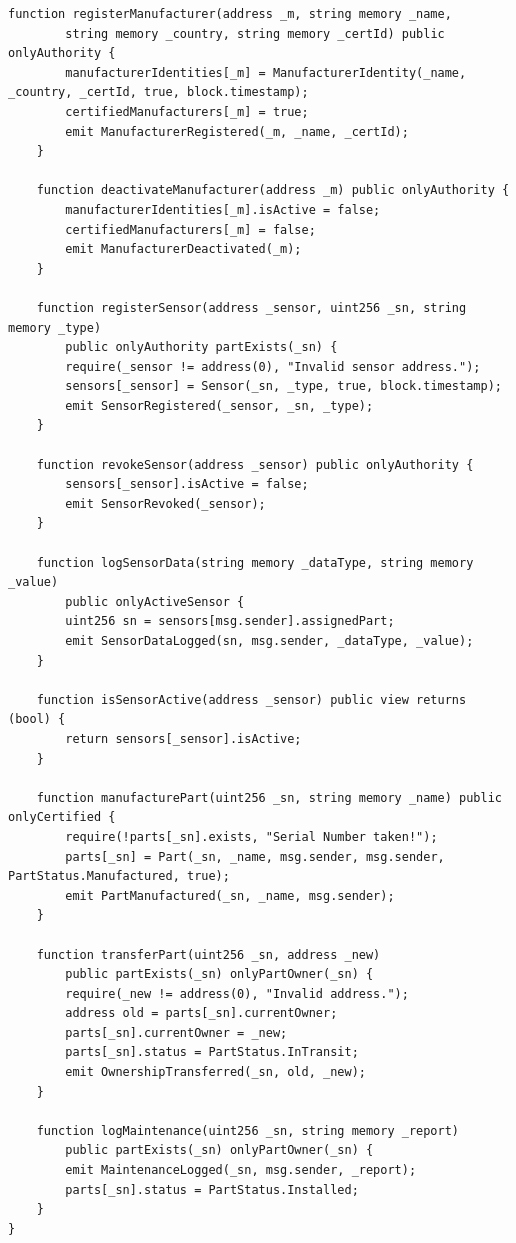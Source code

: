 \documentclass[12pt,a4paper]{article}
\begin{document}
\begin{lstlisting}[caption={Step7\_IoTOracle.sol -- Adds IoT sensor system}]
    function registerManufacturer(address _m, string memory _name,
        string memory _country, string memory _certId) public onlyAuthority {
        manufacturerIdentities[_m] = ManufacturerIdentity(_name, _country, _certId, true, block.timestamp);
        certifiedManufacturers[_m] = true;
        emit ManufacturerRegistered(_m, _name, _certId);
    }

    function deactivateManufacturer(address _m) public onlyAuthority {
        manufacturerIdentities[_m].isActive = false;
        certifiedManufacturers[_m] = false;
        emit ManufacturerDeactivated(_m);
    }

    function registerSensor(address _sensor, uint256 _sn, string memory _type)
        public onlyAuthority partExists(_sn) {
        require(_sensor != address(0), "Invalid sensor address.");
        sensors[_sensor] = Sensor(_sn, _type, true, block.timestamp);
        emit SensorRegistered(_sensor, _sn, _type);
    }

    function revokeSensor(address _sensor) public onlyAuthority {
        sensors[_sensor].isActive = false;
        emit SensorRevoked(_sensor);
    }

    function logSensorData(string memory _dataType, string memory _value)
        public onlyActiveSensor {
        uint256 sn = sensors[msg.sender].assignedPart;
        emit SensorDataLogged(sn, msg.sender, _dataType, _value);
    }

    function isSensorActive(address _sensor) public view returns (bool) {
        return sensors[_sensor].isActive;
    }

    function manufacturePart(uint256 _sn, string memory _name) public onlyCertified {
        require(!parts[_sn].exists, "Serial Number taken!");
        parts[_sn] = Part(_sn, _name, msg.sender, msg.sender, PartStatus.Manufactured, true);
        emit PartManufactured(_sn, _name, msg.sender);
    }

    function transferPart(uint256 _sn, address _new)
        public partExists(_sn) onlyPartOwner(_sn) {
        require(_new != address(0), "Invalid address.");
        address old = parts[_sn].currentOwner;
        parts[_sn].currentOwner = _new;
        parts[_sn].status = PartStatus.InTransit;
        emit OwnershipTransferred(_sn, old, _new);
    }

    function logMaintenance(uint256 _sn, string memory _report)
        public partExists(_sn) onlyPartOwner(_sn) {
        emit MaintenanceLogged(_sn, msg.sender, _report);
        parts[_sn].status = PartStatus.Installed;
    }
}
\end{lstlisting}
\end{document}
